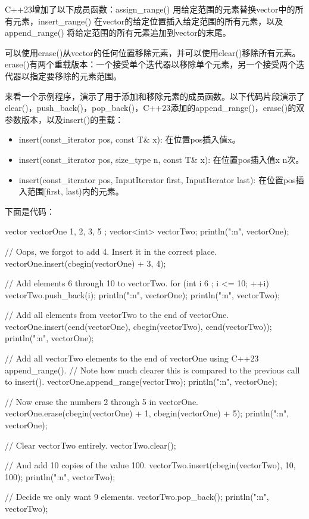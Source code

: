 C++23增加了以下成员函数：assign\_range() 用给定范围的元素替换vector中的所有元素，insert\_range() 在vector的给定位置插入给定范围的所有元素，以及append\_range() 将给定范围的所有元素追加到vector的末尾。

可以使用erase()从vector的任何位置移除元素，并可以使用clear()移除所有元素。erase()有两个重载版本：一个接受单个迭代器以移除单个元素，另一个接受两个迭代器以指定要移除的元素范围。

来看一个示例程序，演示了用于添加和移除元素的成员函数。以下代码片段演示了clear()，push\_back()，pop\_back()，C++23添加的append\_range()，erase()的双参数版本，以及insert()的重载：

\begin{itemize}
\item
insert(const\_iterator pos, const T\& x): 在位置pos插入值x。

\item
insert(const\_iterator pos, size\_type n, const T\& x): 在位置pos插入值x n次。

\item
insert(const\_iterator pos, InputIterator first, InputIterator last): 在位置pos插入范围[first, last)内的元素。
\end{itemize}

下面是代码：

\begin{cpp}
vector vectorOne { 1, 2, 3, 5 };
vector<int> vectorTwo;
println("{:n}", vectorOne);

// Oops, we forgot to add 4. Insert it in the correct place.
vectorOne.insert(cbegin(vectorOne) + 3, 4);

// Add elements 6 through 10 to vectorTwo.
for (int i { 6 }; i <= 10; ++i) {
    vectorTwo.push_back(i);
}
println("{:n}", vectorOne);
println("{:n}", vectorTwo);

// Add all elements from vectorTwo to the end of vectorOne.
vectorOne.insert(cend(vectorOne), cbegin(vectorTwo), cend(vectorTwo));
println("{:n}", vectorOne);

// Add all vectorTwo elements to the end of vectorOne using C++23 append_range().
// Note how much clearer this is compared to the previous call to insert().
vectorOne.append_range(vectorTwo);
println("{:n}", vectorOne);

// Now erase the numbers 2 through 5 in vectorOne.
vectorOne.erase(cbegin(vectorOne) + 1, cbegin(vectorOne) + 5);
println("{:n}", vectorOne);

// Clear vectorTwo entirely.
vectorTwo.clear();

// And add 10 copies of the value 100.
vectorTwo.insert(cbegin(vectorTwo), 10, 100);
println("{:n}", vectorTwo);

// Decide we only want 9 elements.
vectorTwo.pop_back();
println("{:n}", vectorTwo);
\end{cpp}

